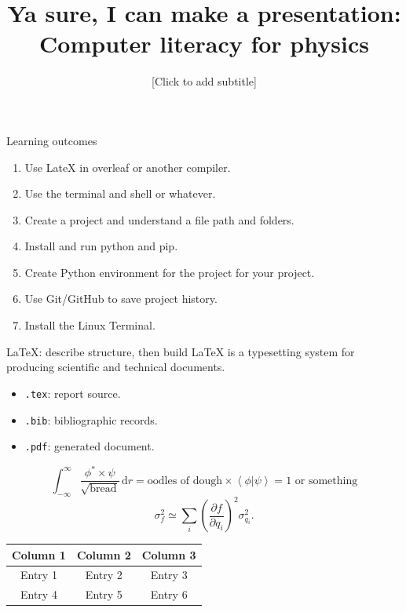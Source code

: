\documentclass[aspectratio=169,11pt]{beamer}
\title{Ya sure, I can make a presentation: Computer literacy for physics}
\institute{UCC Physics and Astronomy Society}
\date{[Click to add subtitle]}
\begin{document}
\begin{frame}
  \titlepage
\end{frame}



\begin{frame}{Learning outcomes}
  \begin{enumerate}
    \item Use LateX in overleaf or another compiler.
    \item Use the terminal and shell or whatever.
    \item Create a project and understand a file path and folders.
    \item Install and run python and pip. 
    \item Create Python environment for the project for your project.
    \item Use Git/GitHub to save project history.
    \item Install the Linux Terminal.
  \end{enumerate}
\end{frame}


\begin{frame}{LaTeX: describe structure, then build}
  LaTeX is a typesetting system for producing scientific and technical documents.
  \begin{itemize}
    \item \texttt{.tex}: report source.
    \item \texttt{.bib}: bibliographic records.
    \item \texttt{.pdf}: generated document.
  \end{itemize}

  \[
  \int^\infty_{-\infty} \frac{\phi^* \times \psi}{\sqrt{\text{bread}}} \, \mathrm{d}r = \text{oodles of dough} \times \left\langle \phi | \psi \right\rangle =  1 \text{ or something}
  \]
  \[
    \sigma_f^2 \simeq
      \sum_i \left(\frac{\partial f}{\partial q_i}\right)^2 \sigma_{q_i}^2.
  \]
  \centering

  \begin{tabular}{|c|c|c|}
    \hline
    Column 1 & Column 2 & Column 3 \\
    \hline
    Entry 1 & Entry 2 & Entry 3 \\
    Entry 4 & Entry 5 & Entry 6 \\
    \hline
  \end{tabular}

\end{frame}
\end{document}
